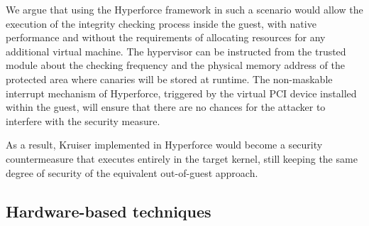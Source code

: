 We argue that using the Hyperforce framework in such a scenario would allow the execution of the integrity checking process inside the guest, with native performance and without the requirements of allocating resources for any additional virtual machine. 
The hypervisor can be instructed from the trusted module about the checking frequency and the physical memory address of the protected area where canaries will be stored at runtime. The non-maskable interrupt mechanism of Hyperforce, triggered by the virtual PCI device installed within the guest, will ensure that there are no chances for the attacker to interfere with the security measure. 

As a result, Kruiser implemented in Hyperforce would become a security countermeasure that executes entirely in the target kernel, still keeping the same degree of security of the equivalent out-of-guest approach.


\subsection{Hardware-based techniques} \label{hwbased}

